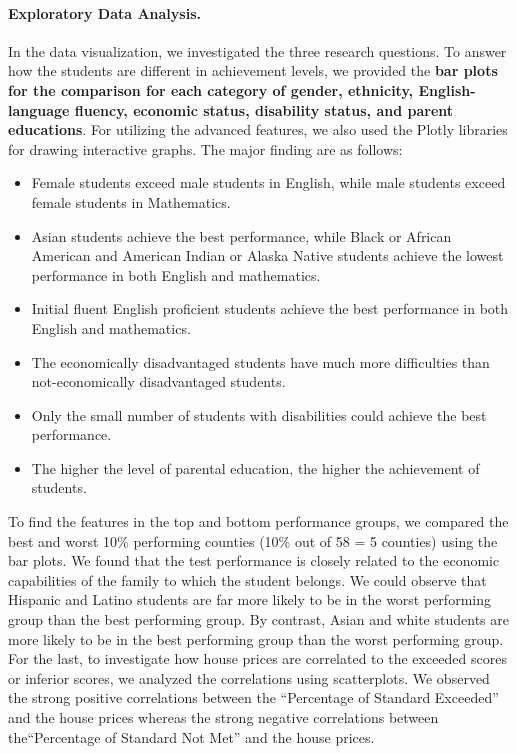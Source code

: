 \documentclass[11pt]{article}
\begin{document}
\paragraph*{Exploratory Data Analysis.}
In the data visualization, we investigated the three research questions. 
To answer how the students are different in achievement levels, we provided the \textbf{bar plots for the comparison for each category of gender, ethnicity, English-language fluency, economic status, disability status, and parent educations}.
For utilizing the advanced features, we also used the Plotly libraries for drawing interactive graphs.
The major finding are as follows:
\begin{itemize}
	\item Female students exceed male students in English, while male students exceed female students in Mathematics.
\item Asian students achieve the best performance, while Black or African American and American Indian or Alaska Native students achieve the lowest performance in both English and mathematics.
\item Initial fluent English proficient students achieve the best performance in both English and mathematics.
\item The economically disadvantaged students have much more difficulties than not-economically disadvantaged students.
\item Only the small number of students with disabilities could achieve the best performance.
\item The higher the level of parental education, the higher the achievement of students.
\end{itemize}
To find the features in the top and bottom performance groups,
we compared the best and worst 10\% performing counties (10\% out of 58 = 5 counties) using the bar plots. 
We found that the test performance is closely related
to the economic capabilities of the family to which the student belongs.
%
We could observe that Hispanic and Latino students are far more likely to be in the worst performing group than the best performing group.
%
By contrast, Asian and white students are more likely to be in the best performing group than the worst performing group.
For the last, to investigate how house prices are correlated to the exceeded scores or inferior scores, we analyzed the correlations using scatterplots. We observed the strong positive correlations between the ``Percentage of Standard Exceeded” and the house prices whereas the strong negative correlations between the``Percentage of Standard Not Met” and the house prices.
\end{document}
